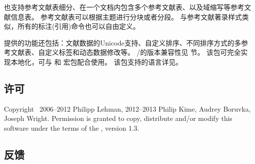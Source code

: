 \biblatex 也支持参考文献表细分、在一个文档内包含多个参考文献表、以及域缩写等参考文献信息表。
参考文献表可以根据主题进行分块或者分段。
与参考文献著录样式类似，所有的标注(引用)命令也可以自由定义。

提供的功能还包括：文献数据的Unicode支持、自定义排序、不同排序方式的多参考文献表、自定义标签和动态数据修改等。
\biber/\biblatex 的版本兼容性见  节。
该包可完全实现本地化，可与  和  宏包配合使用。
该包支持的语言详见。


\subsection{许可}

Copyright \textcopyright\ 2006--2012 Philipp Lehman, 2012--2013 Philip Kime, Audrey Boruvka, Joseph Wright. Permission is granted to copy, distribute and\slash or modify this software under  the terms of the \lppl, version 1.3.

\subsection{反馈}
\label{int:feb}


